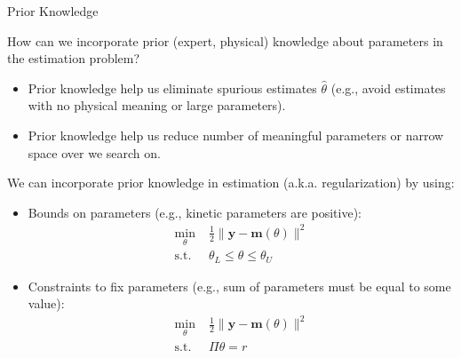\documentclass[9pt]{beamer}
\begin{document}
%
\begin{frame}{Prior Knowledge}

\begin{block}{}
How can we incorporate prior (expert, physical) knowledge about parameters in the estimation problem? 
\end{block}
\begin{itemize}
\item Prior knowledge help us eliminate spurious estimates $\hat{\theta}$ (e.g., avoid estimates with no physical meaning or large parameters). 
\item Prior knowledge help us reduce number of meaningful parameters or narrow space over we search on.
\end{itemize}
We can incorporate prior knowledge in estimation (a.k.a. regularization) by using: 
\begin{itemize}
\item Bounds on parameters (e.g., kinetic parameters are positive):
\begin{align*}
\min_{\theta}& \; \frac{1}{2}\|\mathbf{y}- \mathbf{m}(\theta)\|^2\\ 
\textrm{s.t.}&\; \theta_L\leq \theta\leq\theta_U 
\end{align*}
\item Constraints to fix parameters (e.g., sum of parameters must be equal to some value):
\begin{align*}
\min_{\theta}& \; \frac{1}{2}\|\mathbf{y}- \mathbf{m}(\theta)\|^2\\ 
\textrm{s.t.}&\; \Pi \theta = r
\end{align*}

\end{itemize}
\end{frame}
\end{document}
